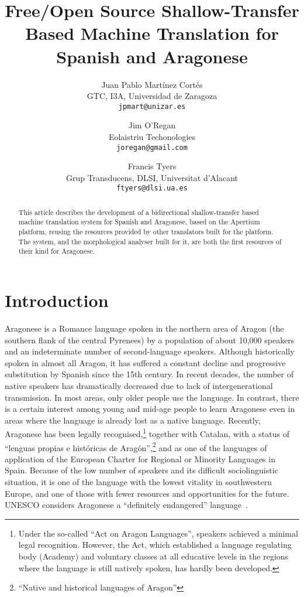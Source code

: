 \documentclass[10pt, a4paper]{article}
\title{Free/Open Source Shallow-Transfer Based Machine Translation for Spanish and Aragonese} %
\author{Juan Pablo Mart\'inez Cort\'es\\ GTC, I3A, Universidad de Zaragoza \\ {\tt jpmart@unizar.es}
\and Jim O’Regan\\ Eolaistriu Techonologies \\ {\tt joregan@gmail.com}
\and Francis Tyers\\ Grup Transducens, DLSI, Universitat d'Alacant \\ {\tt ftyers@dlsi.ua.es}}
\begin{document}
  \maketitle
  \begin{abstract}
This article describes the development of a bidirectional shallow-transfer based machine translation system for Spanish and Aragonese, based on the Apertium platform, reusing the resources provided by other translators built for the platform. The system, and the morphological analyser built for it, are both the first resources of their kind for Aragonese. %
  \end{abstract}
  
  \section{Introduction}
  Aragonese is a Romance language spoken in the northern area of Aragon (the southern flank of the central Pyrenees) by a population of about 10,000 speakers and an indeterminate number of second-language speakers. 
  Although historically spoken in almost all Aragon, it has suffered a constant decline and progressive substitution by Spanish since the 15th century. 
  In recent decades, the number of native speakers has dramatically decreased due to lack of intergenerational transmission. 
  In most areas, only older people use the language. 
  In contrast, there is a certain interest among young and mid-age people to learn Aragonese even in areas where the language is already lost as a native language. Recently, Aragonese has been legally recognised,\footnote{Under the so-called ``Act on Aragon Languages'', speakers achieved a minimal legal recognition. However, the Act, which established a language regulating body (Academy) and voluntary classes at all educative levels in the regions where the language is still natively spoken, has hardly been developed.} together with Catalan, with a status of ``lenguas propias e históricas de Aragón'',\footnote{``Native and historical languages of Aragon''} and as one of the languages of application of the European Charter for Regional or Minority Languages in Spain. 
  Because of the low number of speakers and its difficult sociolinguistic situation, it is one of the language with the lowest vitality in southwestern Europe, and one of those with fewer resources and opportunities for the future. 
  UNESCO considers Aragonese a ``definitely endangered'' language~\cite{UNESCO}.
\end{document}
